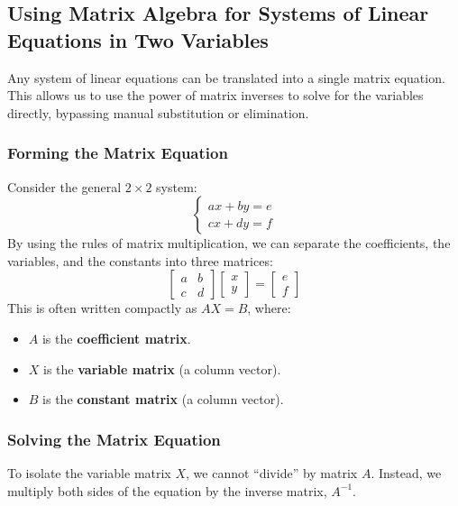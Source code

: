 
\subsection{Using Matrix Algebra for Systems of Linear Equations in Two Variables}

Any system of linear equations can be translated into a single matrix equation. This allows us to use the power of matrix inverses to solve for the variables directly, bypassing manual substitution or elimination.

\subsubsection*{Forming the Matrix Equation}

Consider the general $2 \times 2$ system:
\[
\begin{cases}
ax + by = e \\
cx + dy = f
\end{cases}
\]
By using the rules of matrix multiplication, we can separate the coefficients, the variables, and the constants into three matrices:
\[
\begin{bmatrix} a & b \\ c & d \end{bmatrix} \begin{bmatrix} x \\ y \end{bmatrix} = \begin{bmatrix} e \\ f \end{bmatrix}
\]
This is often written compactly as $AX = B$, where:
\begin{itemize}[leftmargin=*]
  \item $A$ is the \textbf{coefficient matrix}.
  \item $X$ is the \textbf{variable matrix} (a column vector).
  \item $B$ is the \textbf{constant matrix} (a column vector).
\end{itemize}

\subsubsection*{Solving the Matrix Equation}

To isolate the variable matrix $X$, we cannot ``divide'' by matrix $A$. Instead, we multiply both sides of the equation by the inverse matrix, $A^{-1}$.


